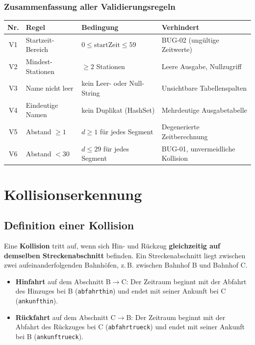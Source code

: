 \documentclass[12pt,a4paper]{article}
\begin{document}
\subsubsection*{Zusammenfassung aller Validierungsregeln}

\begin{center}
\begin{tabular}{clll}
\toprule
\textbf{Nr.} & \textbf{Regel} & \textbf{Bedingung} & \textbf{Verhindert} \\
\midrule
V1 & Startzeit-Bereich  & $0 \leq \text{startZeit} \leq 59$  & BUG-02 (ungültige Zeitwerte) \\
V2 & Mindest-Stationen  & $\geq 2$ Stationen                  & Leere Ausgabe, Nullzugriff \\
V3 & Name nicht leer    & kein Leer- oder Null-String         & Unsichtbare Tabellenspalten \\
V4 & Eindeutige Namen   & kein Duplikat (HashSet)             & Mehrdeutige Ausgabetabelle \\
V5 & Abstand $\geq 1$   & $d \geq 1$ für jedes Segment        & Degenerierte Zeitberechnung \\
V6 & Abstand $< 30$     & $d \leq 29$ für jedes Segment       & BUG-01, unvermeidliche Kollision \\
\bottomrule
\end{tabular}
\end{center}

\section{Kollisionserkennung}

\subsection{Definition einer Kollision}

Eine \textbf{Kollision} tritt auf, wenn sich Hin- und Rückzug \textbf{gleichzeitig auf demselben Streckenabschnitt} befinden. Ein Streckenabschnitt liegt zwischen zwei aufeinanderfolgenden Bahnhöfen, z.\,B. zwischen Bahnhof B und Bahnhof C.

\begin{itemize}
    \item \textbf{Hinfahrt} auf dem Abschnitt B$\to$C: Der Zeitraum beginnt mit der Abfahrt des Hinzuges bei B (\texttt{abfahrthin}) und endet mit seiner Ankunft bei C (\texttt{ankunfthin}).
    \item \textbf{Rückfahrt} auf dem Abschnitt C$\to$B: Der Zeitraum beginnt mit der Abfahrt des Rückzuges bei C (\texttt{abfahrtrueck}) und endet mit seiner Ankunft bei B (\texttt{ankunftrueck}).
\end{itemize}
\end{document}
